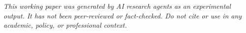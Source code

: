\documentclass[11pt]{article}
\begin{document}
\bigskip
\noindent\textit{This working paper was generated by AI research agents as an
experimental output. It has not been peer-reviewed or fact-checked.
Do not cite or use in any academic, policy, or professional context.}




\end{document}
